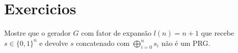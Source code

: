 
\section{Exercicios}
\label{sec:exercicios}

\begin{exercicio}
Mostre que o gerador $G$ com fator de expansão $l(n) = n + 1$ que recebe $s \in \{0,1\}^n$ e devolve $s$ concatenado com $\bigoplus_{i=0}^ns_i$ não é um PRG.  
\end{exercicio}


